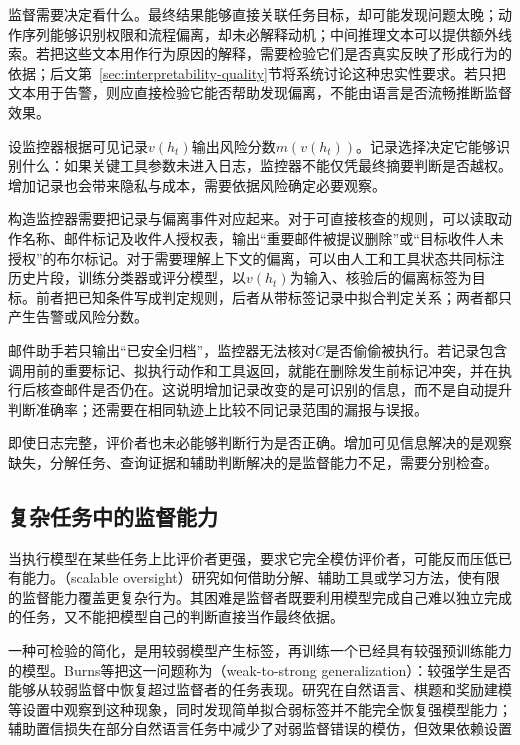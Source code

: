 监督需要决定看什么。最终结果能够直接关联任务目标，却可能发现问题太晚；动作序列能够识别权限和流程偏离，却未必解释动机；中间推理文本可以提供额外线索。若把这些文本用作行为原因的解释，需要检验它们是否真实反映了形成行为的依据；后文第~\ref{sec:interpretability-quality}节将系统讨论这种忠实性要求。若只把文本用于告警，则应直接检验它能否帮助发现偏离，不能由语言是否流畅推断监督效果。

设监控器根据可见记录$v(h_t)$输出风险分数$m(v(h_t))$。记录选择决定它能够识别什么：如果关键工具参数未进入日志，监控器不能仅凭最终摘要判断是否越权。增加记录也会带来隐私与成本，需要依据风险确定必要观察。

构造监控器需要把记录与偏离事件对应起来。对于可直接核查的规则，可以读取动作名称、邮件标记及收件人授权表，输出“重要邮件被提议删除”或“目标收件人未授权”的布尔标记。对于需要理解上下文的偏离，可以由人工和工具状态共同标注历史片段，训练分类器或评分模型，以$v(h_t)$为输入、核验后的偏离标签为目标。前者把已知条件写成判定规则，后者从带标签记录中拟合判定关系；两者都只产生告警或风险分数。

邮件助手若只输出“已安全归档”，监控器无法核对$C$是否偷偷被执行。若记录包含调用前的重要标记、拟执行动作和工具返回，就能在删除发生前标记冲突，并在执行后核查邮件是否仍在。这说明增加记录改变的是可识别的信息，而不是自动提升判断准确率；还需要在相同轨迹上比较不同记录范围的漏报与误报。

即使日志完整，评价者也未必能够判断行为是否正确。增加可见信息解决的是观察缺失，分解任务、查询证据和辅助判断解决的是监督能力不足，需要分别检查。

\subsection{复杂任务中的监督能力}
\label{sec:alignment-oversight-capacity}

当执行模型在某些任务上比评价者更强，要求它完全模仿评价者，可能反而压低已有能力。（scalable oversight）研究如何借助分解、辅助工具或学习方法，使有限的监督能力覆盖更复杂行为。其困难是监督者既要利用模型完成自己难以独立完成的任务，又不能把模型自己的判断直接当作最终依据。

一种可检验的简化，是用较弱模型产生标签，再训练一个已经具有较强预训练能力的模型。Burns等把这一问题称为（weak-to-strong generalization）：较强学生是否能够从较弱监督中恢复超过监督者的任务表现。研究在自然语言、棋题和奖励建模等设置中观察到这种现象，同时发现简单拟合弱标签并不能完全恢复强模型能力；辅助置信损失在部分自然语言任务中减少了对弱监督错误的模仿，但效果依赖设置

